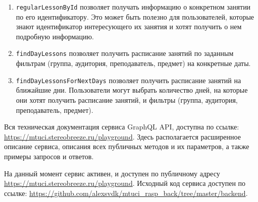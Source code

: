 \begin{enumerate}
\item \texttt{regularLessonById} позволяет получать информацию о конкретном занятии по его идентификатору. Это может быть полезно для пользователей, которые знают идентификатор интересующего их занятия и хотят получить о нем подробную информацию.
\item \texttt{findDayLessons} позволяет получить расписание занятий по заданным фильтрам (группа, аудитория, преподаватель, предмет) на конкретные даты.
\item \texttt{findDayLessonsForNextDays} позволяет получить расписание занятий на ближайшие дни. Пользователи могут выбрать количество дней, на которые они хотят получить расписание занятий, и фильтры (группа, аудитория, преподаватель, предмет).
\end{enumerate}

Вся техническая документация сервиса GraphQL API, доступна по ссылке:
\url{https://mtuci.stereobreeze.ru/playground}.
Здесь располагается расширенное описание сервиса, описания всех публичных методов и их параметров,
а также примеры запросов и ответов.

На данный момент сервис активен, и доступен по публичному адресу \url{https://mtuci.stereobreeze.ru/playground}.
Исходный код сервиса доступен по ссылке: \url{https://github.com/alexsvdk/mtuci_rasp_back/tree/master/backend}.